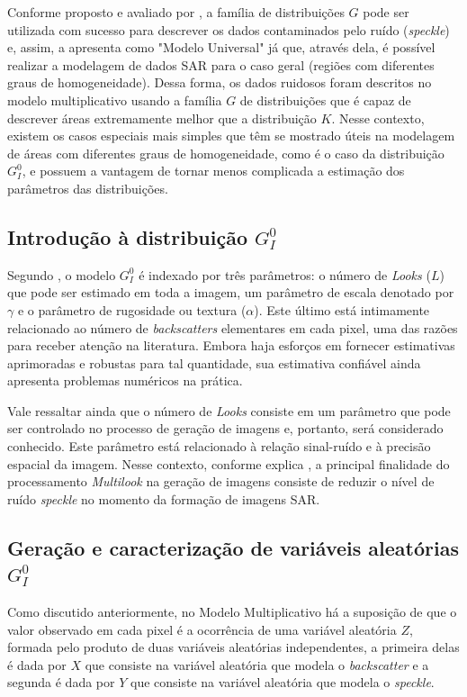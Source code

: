Conforme proposto e avaliado por \citet{Clutter1997}, a família de distribuições $G$ pode ser utilizada com sucesso para descrever os dados contaminados pelo ruído (\textit{speckle}) e, assim, a apresenta como "Modelo Universal" já que, através dela, é possível realizar a modelagem de dados SAR para o caso geral (regiões com diferentes graus de homogeneidade). Dessa forma, os dados ruidosos foram descritos no modelo multiplicativo usando a família $G$ de distribuições que é capaz de descrever áreas extremamente  melhor que a distribuição $K$. Nesse contexto, existem os casos especiais mais simples que têm se mostrado úteis na modelagem de áreas com diferentes graus de homogeneidade, como é o caso da distribuição $G_I^0$, e possuem a vantagem de tornar menos complicada a estimação dos parâmetros das distribuições. 


\subsection{Introdução à distribuição $G_I^0$}

Segundo \citet{FreryStochasticDistances2015}, o modelo $G_I^0$ é indexado por três parâmetros: o número de \textit{Looks} ($L$) que pode ser estimado em toda a imagem, um parâmetro de escala denotado por $\gamma$ e o parâmetro de rugosidade ou textura ($\alpha$). Este último está intimamente relacionado ao número de \textit{backscatters} elementares em cada pixel, uma das razões para receber atenção na literatura. Embora haja esforços em fornecer estimativas aprimoradas e robustas para tal quantidade, sua estimativa confiável ainda apresenta problemas numéricos na prática.

Vale ressaltar ainda que o número de \textit{Looks} consiste em um parâmetro que pode ser controlado no processo de geração de imagens e, portanto, será considerado conhecido. Este parâmetro está relacionado à relação sinal-ruído e à precisão espacial da imagem. Nesse contexto, conforme explica \citet{dissert_torres}, a principal finalidade do processamento \textit{Multilook} na geração de imagens consiste de reduzir o nível de ruído \textit{speckle} no momento da formação de imagens SAR. 

\subsection{Geração e caracterização de variáveis aleatórias $G_I^0$}

Como discutido anteriormente, no Modelo Multiplicativo há a suposição de que o valor observado em cada pixel é a ocorrência de uma variável aleatória $Z$, formada pelo produto de duas variáveis aleatórias independentes, a primeira delas é dada por $X$ que consiste na variável aleatória que modela o \textit{backscatter} e a segunda é dada por $Y$ que consiste na variável aleatória que modela o \textit{speckle}.

